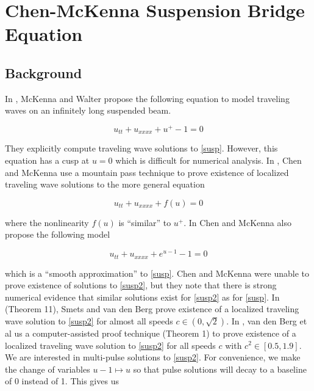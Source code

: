 \documentclass[12pt]{article}
\begin{document}
\section{Chen-McKenna Suspension Bridge Equation}

\subsection{Background}

In \cite{McKenna1990}, McKenna and Walter propose the following equation to model traveling waves on an infinitely long suspended beam.

\begin{equation}\label{susp}
u_{tt} + u_{xxxx} + u^+ - 1 = 0
\end{equation}

They explicitly compute traveling wave solutions to \eqref{susp}. However, this equation has a cusp at $u = 0$ which is difficult for numerical analysis. In \cite{Chen1997}, Chen and McKenna use a mountain pass technique to prove existence of localized traveling wave solutions to the more general equation

\begin{equation}\label{suspgen}
u_{tt} + u_{xxxx} + f(u) = 0
\end{equation}

where the nonlinearity $f(u)$ is ``similar'' to $u^+$. In \cite{Chen1997} Chen and McKenna also propose the following model

\begin{equation}\label{susp2}
u_{tt} + u_{xxxx} + e^{u - 1} - 1 = 0
\end{equation}

which is a ``smooth approximation'' to \eqref{susp}. Chen and McKenna were unable to prove existence of solutions to \eqref{susp2}, but they note that there is strong numerical evidence that similar solutions exist for \eqref{susp2} as for \eqref{susp}. In \cite{Smets2002} (Theorem 11), Smets and van den Berg prove existence of a localized traveling wave solution to \eqref{susp2} for almost all speeds $c \in (0, \sqrt{2})$. In \cite{Berg2018}, van den Berg et al us a computer-assisted proof technique (Theorem 1) to prove existence of a localized traveling wave solution to \eqref{susp2} for all speeds $c$ with $c^2 \in [0.5, 1.9]$.\\

We are interested in multi-pulse solutions to \eqref{susp2}. For convenience, we make the change of variables $u - 1 \mapsto u$ so that pulse solutions will decay to a baseline of 0 instead of 1. This gives us
\end{document}
